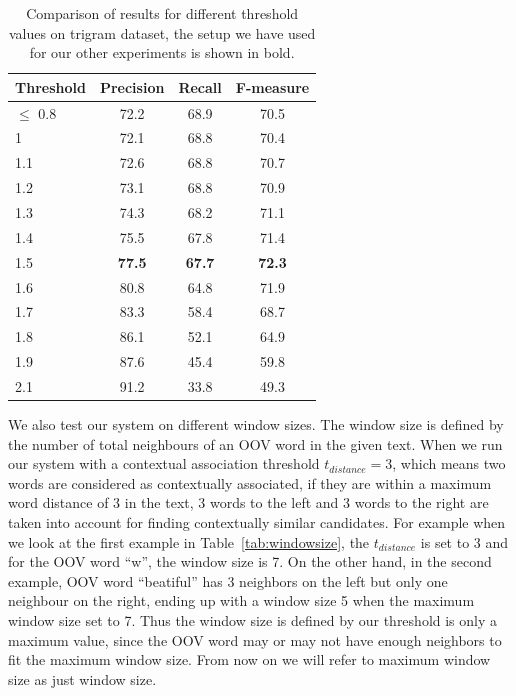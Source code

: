 \documentclass[a4paper,onesided,12pt]{report}
\begin{document}
\begin{table}[thb]
  \caption{Comparison of results for different threshold values on trigram dataset, the setup we have used for our other experiments is shown in bold.}
  \centering
  \begin{tabular}[th]{|l|c|c|c|}
    \hline
    \textbf{Threshold} & \textbf{Precision} & \textbf{Recall} & \textbf{F-measure} \\
    \hline
    $\leq$ 0.8 &	72.2 & 68.9  &	70.5 \\\hline
    1   & 72.1 & 68.8 &	70.4 \\\hline
    1.1 & 72.6 & 68.8 &	70.7 \\\hline
    1.2 & 73.1 & 68.8 &	70.9 \\\hline
    1.3 & 74.3 & 68.2 & 71.1 \\\hline
    1.4 & 75.5 & 67.8 &	71.4 \\\hline
    1.5 &  \textbf{77.5}  & \textbf{67.7} &  \textbf{72.3} \\\hline
    1.6 & 80.8	& 64.8	& 71.9 \\\hline
    1.7	& 83.3	& 58.4	& 68.7 \\\hline
    1.8	& 86.1	& 52.1	& 64.9 \\\hline
    1.9	& 87.6	& 45.4	& 59.8 \\    \hline
    2.1	& 91.2	& 33.8	& 49.3 \\    \hline
  \end{tabular}
\label{tab:thresholdspenn}
\end{table}

We also test our system on different window sizes. The window size is defined by the number of total neighbours of an OOV word in the given text. When we run our system with a contextual association threshold $t_{distance}=3$, which means two words are considered as contextually associated, if they are within a maximum word distance of 3 in the text, 3 words to the left and 3 words to the right are taken into account for finding contextually similar candidates. For example when we look at the first example in Table~\ref{tab:windowsize}, the $t_{distance}$ is set to 3 and  for the OOV word ``w'', the window size is 7. On the other hand, in the second example, OOV word ``beatiful'' has 3 neighbors on the left but only one neighbour on the right, ending up with a window size 5 when the maximum window size set to 7. Thus the window size is defined by our threshold is only a maximum value, since the OOV word may or may not have enough neighbors to fit the maximum window size. From now on we will refer to maximum window size as just window size.
\end{document}
